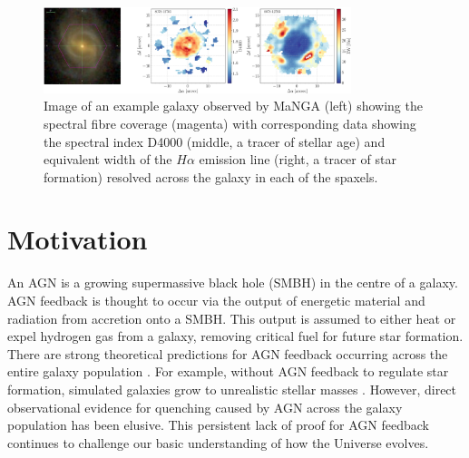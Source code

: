 \documentclass[11pt]{article}
\begin{document}
\begin{figure}[h]
\begin{centering}
\includegraphics[width=0.8\textwidth]{image_halpha_vel_map_8078-12703_gal_aligned_ifu_bundles-MAPS-VOR10-GAU-MILESHC.pdf}
\vspace{-0.5em}
\caption[8pt]{Image of an example galaxy observed by MaNGA (left) showing the spectral fibre coverage (magenta) with corresponding data showing the spectral index D4000 (middle, a tracer of stellar age) and equivalent width of the $H\alpha$ emission line (right, a tracer of star formation) resolved across the galaxy in each of the spaxels.}
\label{gal}
\end{centering}
\vspace{-1.5em}
\end{figure}
\vspace{-0.5em}

\section*{\large Motivation}
\vspace{-0.5em}

\indent An AGN is a growing supermassive black hole (SMBH) in the centre of a galaxy. %
AGN feedback is thought to occur via the output of energetic material and radiation from accretion onto a SMBH. This output is  assumed to either heat or expel hydrogen gas from a galaxy, removing critical fuel for future star formation. There are strong theoretical predictions for AGN feedback occurring across the entire galaxy population \citep{Fabian12, Gaibler12}. For example, without AGN feedback to regulate star formation, simulated galaxies grow to unrealistic stellar masses \citep[e.g.][]{silk12}. However, direct observational evidence for quenching caused by AGN across the galaxy population has been elusive. This persistent lack of proof for AGN feedback continues to challenge our basic understanding of how the Universe evolves. 
\end{document}

